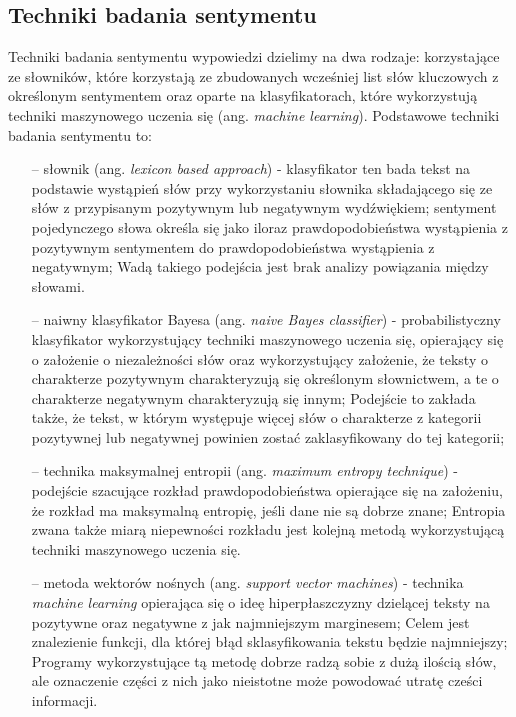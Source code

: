 \subsection{Techniki badania sentymentu}
Techniki badania sentymentu wypowiedzi dzielimy na dwa rodzaje: korzystające ze słowników, które korzystają ze zbudowanych wcześniej list słów kluczowych z określonym sentymentem oraz oparte na klasyfikatorach, które wykorzystują techniki maszynowego uczenia się (ang. \textit{machine learning}). Podstawowe techniki badania sentymentu to:

\begin{itemize}
	\item[--] słownik (ang. \textit{lexicon based approach}) - klasyfikator ten bada tekst na podstawie wystąpień słów przy wykorzystaniu słownika składającego się ze słów z przypisanym pozytywnym lub negatywnym wydźwiękiem; sentyment pojedynczego słowa określa się jako iloraz prawdopodobieństwa wystąpienia z pozytywnym sentymentem do prawdopodobieństwa wystąpienia z negatywnym; Wadą takiego podejścia jest brak analizy powiązania między słowami.
	\item[--] naiwny klasyfikator Bayesa (ang. \textit{naive Bayes classifier}) - probabilistyczny klasyfikator wykorzystujący techniki maszynowego uczenia się, opierający się o założenie o niezależności słów oraz wykorzystujący założenie, że teksty o charakterze pozytywnym charakteryzują się określonym słownictwem, a te o charakterze negatywnym charakteryzują się innym; Podejście to zakłada także, że tekst, w którym występuje więcej słów o charakterze z kategorii pozytywnej lub negatywnej powinien zostać zaklasyfikowany do tej kategorii;
	\item[--] technika maksymalnej entropii (ang. \textit{maximum entropy technique}) - podejście szacujące rozkład prawdopodobieństwa opierające się na założeniu, że rozkład  ma maksymalną entropię, jeśli dane nie są dobrze znane; Entropia zwana także miarą niepewności rozkładu jest kolejną metodą wykorzystującą techniki maszynowego uczenia się.
	\item[--] metoda wektorów nośnych (ang. \textit{support vector machines}) - technika \textit{machine learning} opierająca się o ideę hiperpłaszczyzny dzielącej teksty na pozytywne oraz negatywne z jak najmniejszym marginesem; Celem jest znalezienie funkcji, dla której błąd sklasyfikowania tekstu będzie najmniejszy; Programy wykorzystujące tą metodę dobrze radzą sobie z dużą ilością słów, ale oznaczenie części z nich jako nieistotne może powodować utratę cześci informacji.
\end{itemize}

